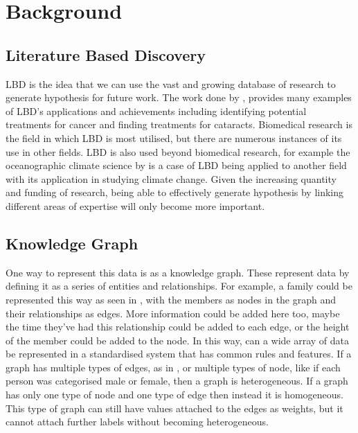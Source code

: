 \documentclass{l4proj}
\begin{document}
\chapter{Background}

\section{Literature Based Discovery}

LBD is the idea that we can use the vast and growing database of research to generate hypothesis for future work. The work done by \cite{henry_literature_2017}, provides many examples of LBD's applications and achievements including identifying potential treatments for cancer and finding treatments for cataracts. Biomedical research is the field in which LBD is most utilised, but there are numerous instances of its use in other fields. LBD is also used beyond biomedical research, for example the oceanographic climate science by \cite{aamot_literature-based_2014} is a case of LBD being applied to another field with its application in studying climate change. Given the increasing quantity and funding of research, being able to effectively generate hypothesis by linking different areas of expertise will only become more important.\\  

\section{Knowledge Graph}

One way to represent this data is as a knowledge graph. These represent data by defining it as a series of entities and relationships. For example, a family could be represented this way as seen in , with the members as nodes in the graph and their relationships as edges. More information could be added here too, maybe the time they've had this relationship could be added to each edge, or the height of the member could be added to the node. In this way, can a wide array of data be represented in a standardised system that has common rules and features. If a graph has multiple types of edges, as in , or multiple types of node, like if each person was categorised male or female, then a graph is heterogeneous. If a graph has only one type of node and one type of edge then instead it is homogeneous. This type of graph can still have values attached to the edges as weights, but it cannot attach further labels without becoming heterogeneous. \\ 
\end{document}
